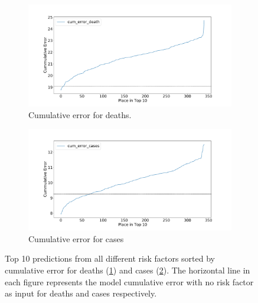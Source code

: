 \documentclass[letterpaper, inpress]{jds} %
\renewcommand{\_}{%
    \textunderscore\hspace{0pt}%
}
\begin{document}
\begin{figure}[!h]
    \begin{subfigure}{.95\textwidth}
        \centering
        \includegraphics[width=1.0\textwidth]{images/predict/PlaceTop10_Death.pdf}
        \caption{Cumulative error for deaths.}
        \label{fig:place-top10-death}
    \end{subfigure}
    \begin{subfigure}{.95\textwidth}
        \centering
        \includegraphics[width=1.0\textwidth]{images/predict/PlaceTop10_Cases.pdf}
        \caption{Cumulative error for cases}
        \label{fig:place-top10-cases}
    \end{subfigure}

    \caption{Top 10 predictions from all different risk factors sorted by cumulative error for deaths (\ref{fig:place-top10-death}) and cases (\ref{fig:place-top10-cases}). The horizontal line in each figure represents the model cumulative error with no risk factor as input for deaths and cases respectively.}
    \label{fig:place-top10}
    
    
\end{figure}
\end{document}
